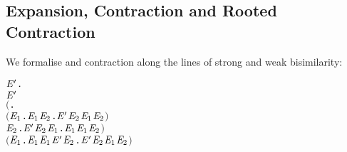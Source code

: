 \subsection{Expansion, Contraction and Rooted Contraction}

We formalise and contraction along the lines of strong and weak bisimilarity:
\begin{alltt}
     \HOLTokenDefEquality{}
     \HOLSymConst{\HOLTokenForall{}} \ensuremath{\HOLBoundVar{E}\sp{\prime}}.
           \ensuremath{\HOLBoundVar{E}\sp{\prime}} \HOLSymConst{\HOLTokenImp{}}
         \ensuremath{(}\HOLSymConst{\HOLTokenForall{}}.
              \ensuremath{(}\HOLSymConst{\HOLTokenForall{}}\ensuremath{\HOLBoundVar{E}\sb{\mathrm{1}}}.  \HOLTokenTransBegin{} \HOLTokenTransEnd \ensuremath{\HOLBoundVar{E}\sb{\mathrm{1}}} \HOLSymConst{\HOLTokenImp{}} \HOLSymConst{\HOLTokenExists{}}\ensuremath{\HOLBoundVar{E}\sb{\mathrm{2}}}. \ensuremath{\HOLBoundVar{E}\sp{\prime}} \HOLTokenTransBegin{} \HOLTokenTransEnd \ensuremath{\HOLBoundVar{E}\sb{\mathrm{2}}} \HOLSymConst{\HOLTokenConj{}}  \ensuremath{\HOLBoundVar{E}\sb{\mathrm{1}}} \ensuremath{\HOLBoundVar{E}\sb{\mathrm{2}}}\ensuremath{)} \HOLSymConst{\HOLTokenConj{}}
              \HOLSymConst{\HOLTokenForall{}}\ensuremath{\HOLBoundVar{E}\sb{\mathrm{2}}}. \ensuremath{\HOLBoundVar{E}\sp{\prime}} \HOLTokenTransBegin{} \HOLTokenTransEnd \ensuremath{\HOLBoundVar{E}\sb{\mathrm{2}}} \HOLSymConst{\HOLTokenImp{}} \HOLSymConst{\HOLTokenExists{}}\ensuremath{\HOLBoundVar{E}\sb{\mathrm{1}}}.  \HOLTokenWeakTransBegin{} \HOLTokenWeakTransEnd \ensuremath{\HOLBoundVar{E}\sb{\mathrm{1}}} \HOLSymConst{\HOLTokenConj{}}  \ensuremath{\HOLBoundVar{E}\sb{\mathrm{1}}} \ensuremath{\HOLBoundVar{E}\sb{\mathrm{2}}}\ensuremath{)} \HOLSymConst{\HOLTokenConj{}}
         \ensuremath{(}\HOLSymConst{\HOLTokenForall{}}\ensuremath{\HOLBoundVar{E}\sb{\mathrm{1}}}.  \HOLTokenTransBegin\HOLSymConst{\ensuremath{\tau}}\HOLTokenTransEnd \ensuremath{\HOLBoundVar{E}\sb{\mathrm{1}}} \HOLSymConst{\HOLTokenImp{}}  \ensuremath{\HOLBoundVar{E}\sb{\mathrm{1}}} \ensuremath{\HOLBoundVar{E}\sp{\prime}} \HOLSymConst{\HOLTokenDisj{}} \HOLSymConst{\HOLTokenExists{}}\ensuremath{\HOLBoundVar{E}\sb{\mathrm{2}}}. \ensuremath{\HOLBoundVar{E}\sp{\prime}} \HOLTokenTransBegin\HOLSymConst{\ensuremath{\tau}}\HOLTokenTransEnd \ensuremath{\HOLBoundVar{E}\sb{\mathrm{2}}} \HOLSymConst{\HOLTokenConj{}}  \ensuremath{\HOLBoundVar{E}\sb{\mathrm{1}}} \ensuremath{\HOLBoundVar{E}\sb{\mathrm{2}}}\ensuremath{)} \HOLSymConst{\HOLTokenConj{}}

\end{alltt}
